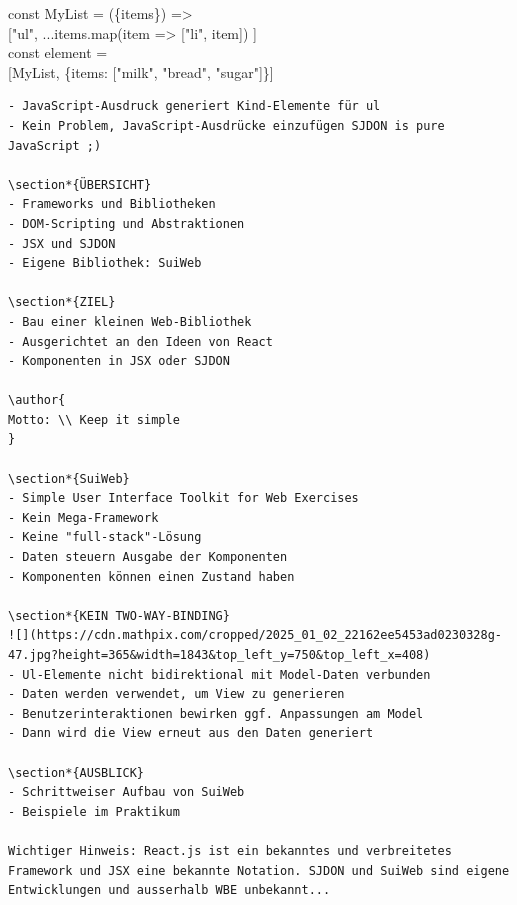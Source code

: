 const MyList = (\{items\}) =>\\[0pt]
["ul", ...items.map(item => ["li", item]) ]\\
const element =\\[0pt]
[MyList, \{items: ["milk", "bread", "sugar"]\}]

\begin{verbatim}
- JavaScript-Ausdruck generiert Kind-Elemente für ul
- Kein Problem, JavaScript-Ausdrücke einzufügen SJDON is pure JavaScript ;)

\section*{ÜBERSICHT}
- Frameworks und Bibliotheken
- DOM-Scripting und Abstraktionen
- JSX und SJDON
- Eigene Bibliothek: SuiWeb

\section*{ZIEL}
- Bau einer kleinen Web-Bibliothek
- Ausgerichtet an den Ideen von React
- Komponenten in JSX oder SJDON

\author{
Motto: \\ Keep it simple
}

\section*{SuiWeb}
- Simple User Interface Toolkit for Web Exercises
- Kein Mega-Framework
- Keine "full-stack"-Lösung
- Daten steuern Ausgabe der Komponenten
- Komponenten können einen Zustand haben

\section*{KEIN TWO-WAY-BINDING}
![](https://cdn.mathpix.com/cropped/2025_01_02_22162ee5453ad0230328g-47.jpg?height=365&width=1843&top_left_y=750&top_left_x=408)
- Ul-Elemente nicht bidirektional mit Model-Daten verbunden
- Daten werden verwendet, um View zu generieren
- Benutzerinteraktionen bewirken ggf. Anpassungen am Model
- Dann wird die View erneut aus den Daten generiert

\section*{AUSBLICK}
- Schrittweiser Aufbau von SuiWeb
- Beispiele im Praktikum

Wichtiger Hinweis: React.js ist ein bekanntes und verbreitetes Framework und JSX eine bekannte Notation. SJDON und SuiWeb sind eigene Entwicklungen und ausserhalb WBE unbekannt...



\end{verbatim}
